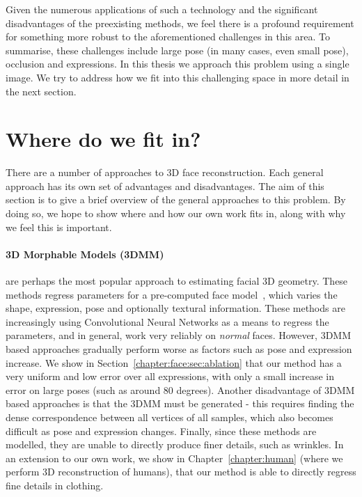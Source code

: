 Given the numerous applications of such a technology and the
significant disadvantages of the preexisting methods, we feel there is
a profound requirement for something more robust to the aforementioned
challenges in this area. To summarise, these challenges include large
pose (in many cases, even small pose), occlusion and expressions. In
this thesis we approach this problem using a single image. We try to
address how we fit into this challenging space in more detail in the
next section.

\section{Where do we fit in?}

There are a number of approaches to 3D face reconstruction. Each
general approach has its own set of advantages and disadvantages. The
aim of this section is to give a brief overview of the general
approaches to this problem. By doing so, we hope to show where and how
our own work fits in, along with why we feel this is important.

\paragraph{3D Morphable Models (3DMM)} are perhaps the most popular
approach to estimating facial 3D geometry. These methods regress
parameters for a pre-computed face
model~\cite{jourabloo2016large,huber2016multiresolution,zhu2016face,liu2016joint},
which varies the shape, expression, pose and optionally textural
information. These methods are increasingly using Convolutional Neural
Networks as a means to regress the parameters, and in general, work
very reliably on \textit{normal} faces. However, 3DMM based approaches
gradually perform worse as factors such as pose and expression
increase. We show in Section~\ref{chapter:face:sec:ablation} that our
method has a very uniform and low error over all expressions, with
only a small increase in error on large poses (such as around 80
degrees). Another disadvantage of 3DMM based approaches is that the
3DMM must be generated - this requires finding the dense
correspondence between all vertices of all samples, which also becomes
difficult as pose and expression changes. Finally, since these methods
are modelled, they are unable to directly produce finer details, such
as wrinkles. In an extension to our own work, we show
in Chapter~\ref{chapter:human} (where we perform 3D reconstruction of humans),
that our method is able to directly regress fine details in clothing.


